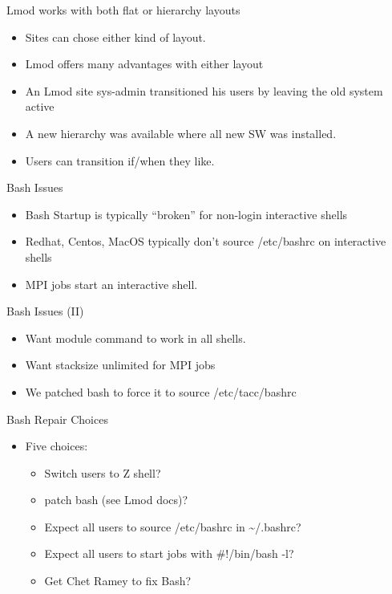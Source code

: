 \documentclass{beamer}
\begin{document}
\begin{frame}{Lmod works with both flat or hierarchy layouts}
  \begin{itemize}
    \item Sites can chose either kind of layout.  
    \item Lmod offers many advantages with either layout
    \item An Lmod site sys-admin transitioned his users by leaving the
      old system active
    \item A new hierarchy was available where all new SW was installed.
    \item Users can transition if/when they like.
  \end{itemize}
\end{frame}

\begin{frame}{Bash Issues}
  \begin{itemize}
    \item Bash Startup is typically ``broken'' for non-login interactive shells
    \item Redhat, Centos, MacOS typically don't source /etc/bashrc on interactive shells
    \item MPI jobs start an interactive shell.
  \end{itemize}
\end{frame}

\begin{frame}{Bash Issues (II)}
  \begin{itemize}
    \item Want module command to work in all shells.
    \item Want stacksize unlimited for MPI jobs
    \item We patched bash to force it to source /etc/tacc/bashrc
  \end{itemize}
\end{frame}

\begin{frame}{Bash Repair Choices}
  \begin{itemize}
    \item Five choices:
      \begin{itemize}
        \item Switch users to Z shell?
        \item patch bash (see Lmod docs)?
        \item Expect all users to source /etc/bashrc in \textasciitilde/.bashrc?
        \item Expect all users to start jobs with \#!/bin/bash -l?
        \item Get Chet Ramey to fix Bash?
      \end{itemize}
  \end{itemize}
\end{frame}
\end{document}
